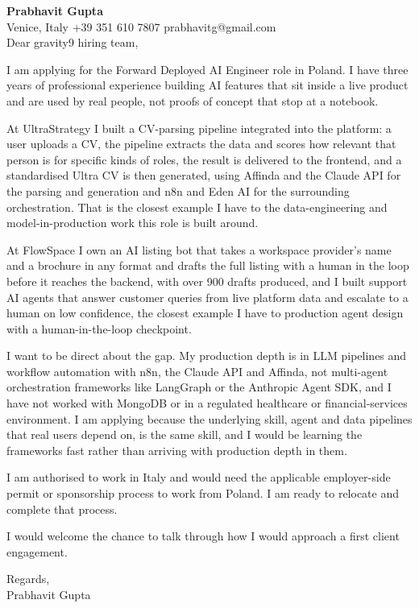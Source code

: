 \documentclass[a4paper,10.5pt]{article}
\begin{document}
\textbf{Prabhavit Gupta}\\
Venice, Italy \textbar{} +39 351 610 7807 \textbar{} prabhavitg@gmail.com\\[10pt]
Dear gravity9 hiring team,

I am applying for the Forward Deployed AI Engineer role in Poland. I have three years of professional experience building AI features that sit inside a live product and are used by real people, not proofs of concept that stop at a notebook.

At UltraStrategy I built a CV-parsing pipeline integrated into the platform: a user uploads a CV, the pipeline extracts the data and scores how relevant that person is for specific kinds of roles, the result is delivered to the frontend, and a standardised Ultra CV is then generated, using Affinda and the Claude API for the parsing and generation and n8n and Eden AI for the surrounding orchestration. That is the closest example I have to the data-engineering and model-in-production work this role is built around.

At FlowSpace I own an AI listing bot that takes a workspace provider's name and a brochure in any format and drafts the full listing with a human in the loop before it reaches the backend, with over 900 drafts produced, and I built support AI agents that answer customer queries from live platform data and escalate to a human on low confidence, the closest example I have to production agent design with a human-in-the-loop checkpoint.

I want to be direct about the gap. My production depth is in LLM pipelines and workflow automation with n8n, the Claude API and Affinda, not multi-agent orchestration frameworks like LangGraph or the Anthropic Agent SDK, and I have not worked with MongoDB or in a regulated healthcare or financial-services environment. I am applying because the underlying skill, agent and data pipelines that real users depend on, is the same skill, and I would be learning the frameworks fast rather than arriving with production depth in them.

I am authorised to work in Italy and would need the applicable employer-side permit or sponsorship process to work from Poland. I am ready to relocate and complete that process.

I would welcome the chance to talk through how I would approach a first client engagement.

Regards,\\
Prabhavit Gupta
\end{document}
